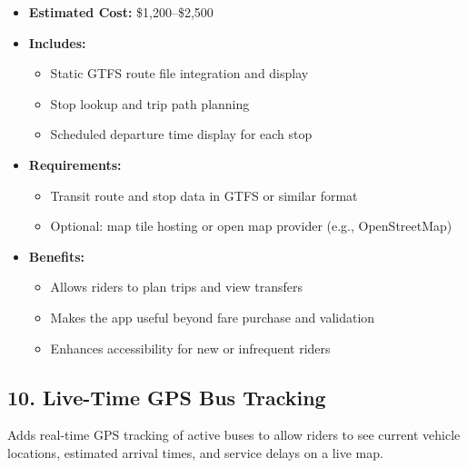 \documentclass[12pt]{article}
\begin{document}
\begin{itemize}
    \item \textbf{Estimated Cost:} \$1,200–\$2,500
    \item \textbf{Includes:}
    \begin{itemize}
        \item Static GTFS route file integration and display
        \item Stop lookup and trip path planning
        \item Scheduled departure time display for each stop
    \end{itemize}
    \item \textbf{Requirements:}
    \begin{itemize}
        \item Transit route and stop data in GTFS or similar format
        \item Optional: map tile hosting or open map provider (e.g., OpenStreetMap)
    \end{itemize}
    \item \textbf{Benefits:}
    \begin{itemize}
        \item Allows riders to plan trips and view transfers
        \item Makes the app useful beyond fare purchase and validation
        \item Enhances accessibility for new or infrequent riders
    \end{itemize}
\end{itemize}

\subsection*{10. Live-Time GPS Bus Tracking}

Adds real-time GPS tracking of active buses to allow riders to see current vehicle locations, estimated arrival times, and service delays on a live map.
\end{document}
